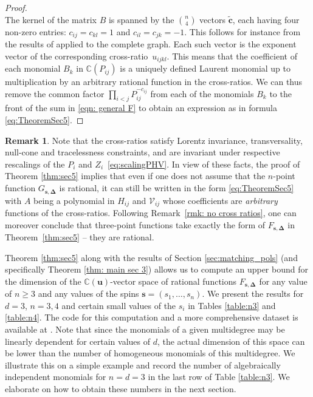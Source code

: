 \documentclass[12pt,a4paper]{extarticle}
\theoremstyle{definition}
\newtheorem{remark}[theorem]{Remark}
\begin{document}
\begin{proof}
\begin{equation*}
    \end{equation*}
    The kernel of the matrix $B$ is spanned by the $\binom{n}{4}$ vectors $\tilde{\mathbf{c}}$, each having four non-zero entries: $c_{ij}=c_{kl}=1$ and $c_{il}=c_{jk}=-1$.
    This follows for instance from the results of \cite{toricideals_graphs} applied to the complete graph. Each such vector is the exponent vector of the corresponding cross-ratio~$u_{ijkl}$. This means that the coefficient of each monomial $B_k$ in $\mathbb{C}(P_{ij})$ is a uniquely defined Laurent monomial up to multiplication by an arbitrary rational function in the cross-ratios. We can thus remove the common factor $\prod_{i<j}P_{ij}^{-c_{ij}}$
    from each of the monomials $B_k$ to the front of the sum in \eqref{eqn: general F} to obtain an expression as in formula \eqref{eq:TheoremSec5}.
\end{proof}

\begin{remark} \label{rem:sec5generalcase}
    Note that the cross-ratios satisfy Lorentz invariance, transversality, null-cone and tracelessness constraints, and are invariant under respective rescalings of the $P_i$ and $Z_i$~\eqref{eq:scalingPHV}. 
    In view of these facts, the proof of Theorem \ref{thm:sec5} implies that even if one does not assume that the $n$-point function $G_{\mathbf{s},\mathbf{\Delta}}$ is rational, it can still be written in the form \eqref{eq:TheoremSec5} with $A$ being a polynomial in $H_{ij}$ and $\mathcal{V}_{ij}$ whose coefficients are \emph{arbitrary} functions of the cross-ratios. Following Remark~\ref{rmk: no cross ratios}, one can moreover conclude that three-point functions take exactly the form of $F_{\mathbf{s},\mathbf{\Delta}}$ in Theorem~\ref{thm:sec5} -- they are rational.
\end{remark}

Theorem \ref{thm:sec5} along with the results of Section \ref{sec:matching_pols} (and specifically Theorem \ref{thm: main sec 3}) allows us to compute an upper bound for the dimension of the $\mathbb{C}(\mathbf{u})$-vector space of rational functions $F_{\mathbf{s},\mathbf{\Delta}}$ for any value of $n\geq 3$ and any values of the spins $\mathbf{s}=(s_1,\ldots,s_n)$.
We present the results for $d=3$, $n=3,4$ and certain small values of the $s_i$ in Tables \ref{table:n3} and \ref{table:n4}. The code for this computation and a more comprehensive dataset is available at \cite{zenodo}. 
Note that since the monomials of a given multidegree may be linearly dependent for certain values of $d$, the actual dimension of this space can be lower than the number of homogeneous monomials of this multidegree. 
We illustrate this on a simple example and record the number of algebraically independent monomials for $n=d=3$ in the last row of Table \ref{table:n3}. 
We elaborate on how to obtain these numbers in the next section.
\end{document}
